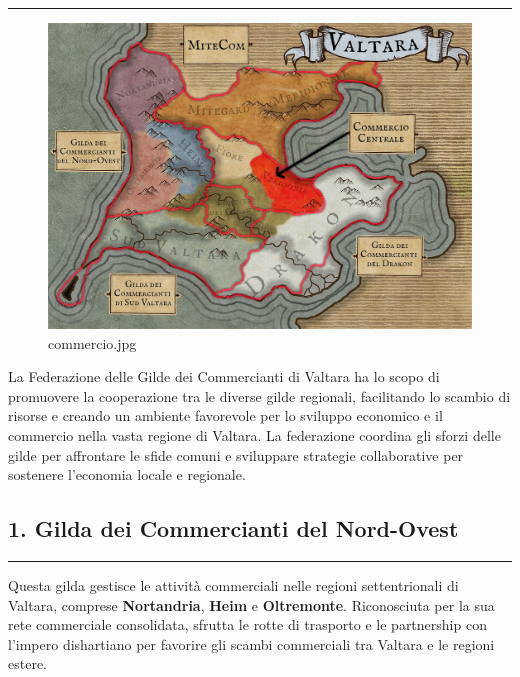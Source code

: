 \begin{center}\rule{0.5\linewidth}{0.5pt}\end{center}

\begin{figure}
\centering
\includegraphics{commercio.jpg}
\caption{commercio.jpg}
\end{figure}

La Federazione delle Gilde dei Commercianti di Valtara ha lo scopo di
promuovere la cooperazione tra le diverse gilde regionali, facilitando
lo scambio di risorse e creando un ambiente favorevole per lo sviluppo
economico e il commercio nella vasta regione di Valtara. La federazione
coordina gli sforzi delle gilde per affrontare le sfide comuni e
sviluppare strategie collaborative per sostenere l'economia locale e
regionale.

\subsection{1. Gilda dei Commercianti del
Nord-Ovest}\label{gilda-dei-commercianti-del-nord-ovest}

\begin{center}\rule{0.5\linewidth}{0.5pt}\end{center}

Questa gilda gestisce le attività commerciali nelle regioni
settentrionali di Valtara, comprese \textbf{Nortandria}, \textbf{Heim} e
\textbf{Oltremonte}. Riconosciuta per la sua rete commerciale
consolidata, sfrutta le rotte di trasporto e le partnership con l'impero
dishartiano per favorire gli scambi commerciali tra Valtara e le regioni
estere.

